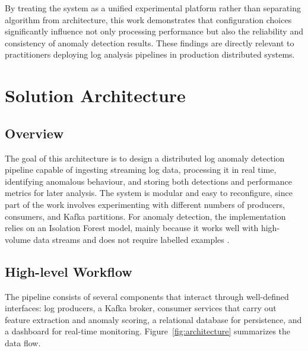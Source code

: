 \documentclass[12pt,a4paper]{report}
\begin{document}
By treating the system as a unified experimental platform rather than separating algorithm from architecture, this work demonstrates that configuration choices significantly influence not only processing performance but also the reliability and consistency of anomaly detection results. These findings are directly relevant to practitioners deploying log analysis pipelines in production distributed systems.

\chapter{Solution Architecture}

\section{Overview}

The goal of this architecture is to design a distributed log anomaly detection pipeline capable of ingesting streaming log data, processing it in real time, identifying anomalous behaviour, and storing both detections and performance metrics for later analysis. The system is modular and easy to reconfigure, since part of the work involves experimenting with different numbers of producers, consumers, and Kafka partitions. For anomaly detection, the implementation relies on an Isolation Forest model, mainly because it works well with high-volume data streams and does not require labelled examples \cite{IDForest2022, Bogatinovski2021}.

\section{High-level Workflow}

The pipeline consists of several components that interact through well-defined interfaces: log producers, a Kafka broker, consumer services that carry out feature extraction and anomaly scoring, a relational database for persistence, and a dashboard for real-time monitoring.
Figure~\ref{fig:architecture} summarizes the data flow.
\end{document}
